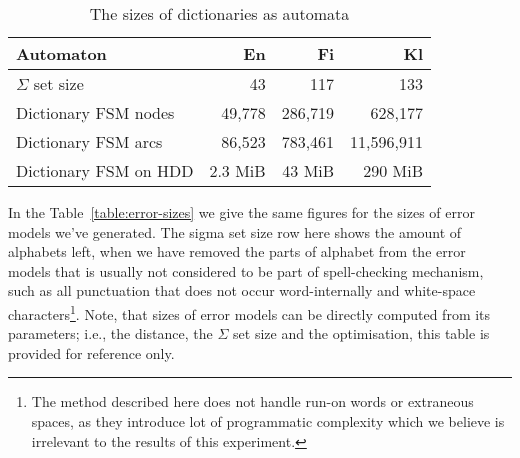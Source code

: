 \documentclass[11pt]{article}
\begin{document}
\begin{table}[h]
\begin{center}
\begin{scriptsize}
\begin{tabular}{|l|rrr|}
\hline
\bf Automaton & \bf En & \bf Fi & \bf Kl  \\ 
\hline
$\Sigma$ set size &
 43& 117& 133
\\
Dictionary FSM nodes &
 49,778& 286,719& 628,177
\\
Dictionary FSM arcs &
 86,523& 783,461& 11,596,911
\\
Dictionary FSM on HDD & 
2.3 MiB &
43 MiB &
290 MiB
\\
\hline
\end{tabular}
\end{scriptsize}
\end{center}
\caption{\label{table:dictionary-sizes}
The sizes of dictionaries as automata}
\end{table}

In the Table~\ref{table:error-sizes} we give the same figures for the
sizes of error models we've generated. The sigma set size row here shows the
amount of alphabets left, when we have removed the parts of alphabet from the
error models that is usually not considered to be part of spell-checking
mechanism, such as all punctuation that does not occur word-internally and
white-space characters\footnote{The method described here does not handle
run-on words or extraneous spaces, as they introduce lot of programmatic
complexity which we believe is irrelevant to the results of this experiment.}.
Note, that sizes of error models can be directly computed from its parameters;
i.e., the distance, the $\Sigma$ set size and the optimisation, this table
is provided for reference only.
\end{document}
